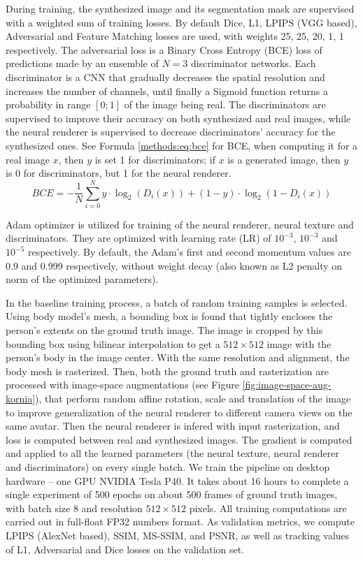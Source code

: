 During training, the synthesized image and its segmentation mask are supervised with a weighted sum of training losses. By default Dice, L1, LPIPS (VGG \cite{dnn:vgg14} based), Adversarial and Feature Matching losses are used, with weights 25, 25, 20, 1, 1 respectively. The adversarial loss is a Binary Cross Entropy (BCE) loss of predictions made by an ensemble of $N=3$ discriminator networks. Each discriminator is a CNN that gradually decreases the spatial resolution and increases the number of channels, until finally a Sigmoid function returns a probability in range $[0;1]$ of the image being real. The discriminators are supervised to improve their accuracy on both synthesized and real images, while the neural renderer is supervised to decrease discriminators' accuracy for the synthesized ones. See Formula \ref{methods:eq:bce} for BCE, when computing it for a real image $x$, then $y$ is set 1 for discriminators; if $x$ is a generated image, then $y$ is 0 for discriminators, but 1 for the neural renderer.
\begin{equation}
	BCE = - \dfrac{1}{N} \sum_{i=0}^N y \cdot \log_{2}(D_i(x)) + (1-y) \cdot \log_{2}(1 - D_i(x)) 
	\label{methods:eq:bce}
\end{equation}

Adam \cite{dnn:adam14} optimizer is utilized for training of the neural renderer, neural texture and discriminators. They are optimized with learning rate (LR) of $10^{-3}$, $10^{-3}$ and $10^{-5}$ respectively. By default, the Adam's first and second momentum values are 0.9 and 0.999 respectively, without weight decay (also known as L2 penalty on norm of the optimized parameters).

In the baseline training process, a batch of random training samples is selected. Using body model's mesh, a bounding box is found that tightly encloses the person's extents on the ground truth image. The image is cropped by this bounding box using bilinear interpolation to get a $512 \times 512$ image with the person's body in the image center. With the same resolution and alignment, the body mesh is rasterized. Then, both the ground truth and rasterization are processed with image-space augmentations (see Figure \ref{fig:image-space-aug-kornia}), that perform random affine rotation, scale and translation of the image to improve generalization of the neural renderer to different camera views on the same avatar. Then the neural renderer is infered with input rasterization, and loss is computed between real and synthesized images. The gradient is computed and applied to all the learned parameters (the neural texture, neural renderer and discriminators) on every single batch. We train the pipeline on desktop hardware -- one GPU NVIDIA Tesla P40. It takes about 16 hours to complete a single experiment of 500 epochs on about 500 frames of ground truth images, with batch size 8 and resolution $512\times512$ pixels. All training computations are carried out in full-float FP32 numbers format. As validation metrics, we compute LPIPS (AlexNet \cite{dnn:alexnet12} based), SSIM, MS-SSIM, and PSNR, as well as tracking values of L1, Adversarial and Dice losses on the validation set.

